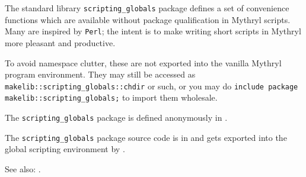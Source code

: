 
The standard library {\tt scripting\_globals} package defines a set of convenience functions 
which are available without package qualification in Mythryl scripts.  
Many are inspired by {\tt Perl}; the 
intent is to make writing short scripts in Mythryl more pleasant and productive.

To avoid 
namespace clutter, these are not exported into the vanilla Mythryl program 
environment.  They may still be accessed as {\tt makelib::scripting\_globals::chdir} 
or such, or you may do {\tt include package makelib::scripting\_globals;} to import 
them wholesale.

The {\tt scripting\_globals} package is defined anonymously in 
.

The {\tt scripting\_globals} package source code is in 
and gets exported into the global scripting environment by 
 .

See also:  .



